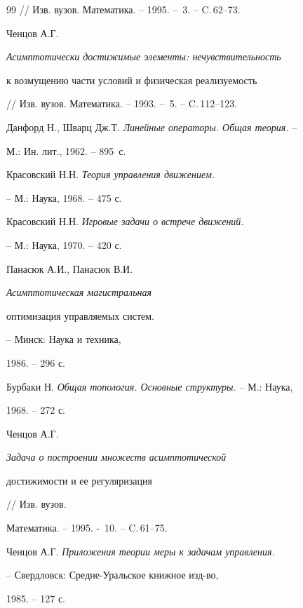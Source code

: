 \begin{thebibliography}{99}
// Изв. вузов. Математика. -- 1995. -- \No\,3. -- C.\,62--73.







Ченцов А.Г. {\em Асимптотически достижимые элементы: нечувствительность


к возмущению части условий и физическая реализуемость}


// Изв. вузов. Математика. -- 1993. -- \No\,5. -- C.\,112--123.







Данфорд Н., Шварц Дж.Т. {\em Линейные операторы. Общая теория.} --


М.: Ин. лит., 1962. -- 895~с.







Красовский Н.Н. {\em Теория управления движением.}


-- М.: Наука, 1968. -- 475 с.







Красовский Н.Н. {\em Игровые задачи о встрече движений.}


-- М.: Наука, 1970. -- 420 с.







Панасюк А.И., Панасюк В.И. {\em Асимптотическая магистральная


оптимизация управляемых систем.} -- Минск: Наука и техника,


1986. -- 296 с.







Бурбаки Н. {\em Общая топология. Основные структуры.} -- М.: Наука,


1968. -- 272 с.







Ченцов А.Г. {\em Задача о построении множеств асимптотической


достижимости и ее регуляризация} // Изв. вузов.


Математика. -- 1995. - \No\,10. -- C.\,61--75.







Ченцов А.Г. {\em Приложения теории меры к задачам управления.}


-- Свердловск: Средне-Уральское книжное изд-во,


1985. -- 127 с.





\end{thebibliography}





